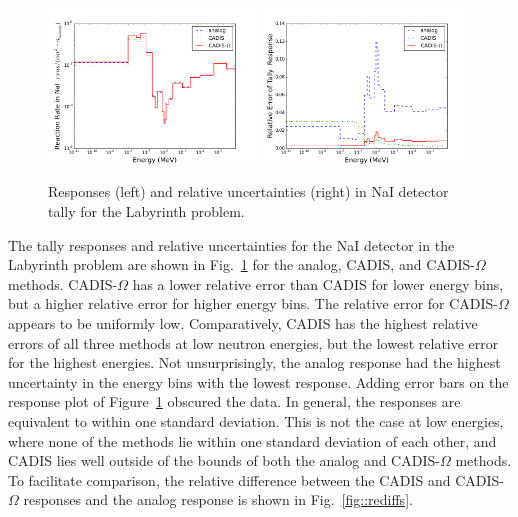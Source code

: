 \documentclass[12pt]{article}
\begin{document}
\begin{figure}
  \begin{center}
    \includegraphics[width=0.49\textwidth]{./images/response.png}
    \includegraphics[width=0.49\textwidth]{./images/response_RE.png}
    \caption[]{\label{fig::tallyresponse} Responses (left) and relative uncertainties (right) in NaI detector tally for the Labyrinth problem. }
  \end{center}
\end{figure}

The tally responses and relative uncertainties for the NaI detector in the Labyrinth problem are shown in Fig.~\ref{fig::tallyresponse} for the analog, CADIS, and CADIS-$\Omega$ methods.  CADIS-$\Omega$ has a lower relative error than CADIS for lower energy bins, but a higher relative error for higher energy bins. The relative error for CADIS-$\Omega$ appears to be uniformly low. Comparatively, CADIS has the highest relative errors of all three methods at low neutron energies, but the lowest relative error for the highest energies. Not unsurprisingly, the analog response had the highest uncertainty in the energy bins with the lowest response. Adding error bars on the response plot of Figure~\ref{fig::tallyresponse} obscured the data. In general, the responses are equivalent to within one standard deviation. This is not the case at low energies, where none of the methods lie within one standard deviation of each other, and CADIS lies well outside of the bounds of both the analog and CADIS-$\Omega$ methods. 
To facilitate comparison, the relative difference between the CADIS and CADIS-$\Omega$ responses and the analog response is shown in Fig.~\ref{fig::rediffs}. 
\end{document}
